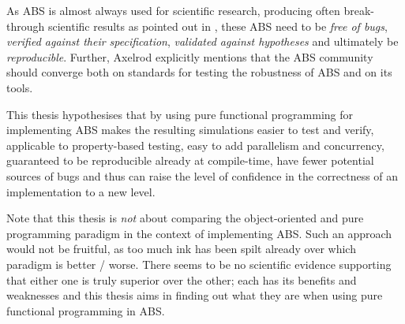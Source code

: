 As ABS is almost always used for scientific research, producing often break-through scientific results as pointed out in \cite{axelrod_chapter_2006}, these ABS need to be \textit{free of bugs}, \textit{verified against their specification}, \textit{validated against hypotheses} and ultimately be \textit{reproducible}. Further, Axelrod explicitly mentions that the ABS community should converge both on standards for testing the robustness of ABS and on its tools.

\bigskip

This thesis hypothesises that by using pure functional programming for implementing ABS makes the resulting simulations easier to test and verify, applicable to property-based testing, easy to add parallelism and concurrency, guaranteed to be reproducible already at compile-time, have fewer potential sources of bugs and thus can raise the level of confidence in the correctness of an implementation to a new level.

\medskip

Note that this thesis is \textit{not} about comparing the object-oriented and pure programming paradigm in the context of implementing ABS. Such an approach would not be fruitful, as too much ink has been spilt already over which paradigm is better / worse. There seems to be no scientific evidence supporting that either one is truly superior over the other; each has its benefits and weaknesses and this thesis aims in finding out what they are when using pure functional programming in ABS.

